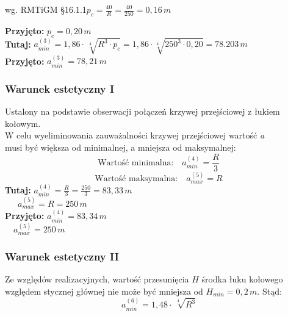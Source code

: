 \documentclass[12pt]{article}
\begin{document}
            \qquad wg. RMTiGM §16.1.1\quad \( p_{c}=\frac{40}{R}=\frac{40}{250}=0,16\,m \)

            \qquad \textbf{Przyjęto:} $p_{c}=0,20\,m$ \\

            \textbf{Tutaj:} \( a_{min}^{(3)} = 1,86 \cdot\, \sqrt[4]{R^{3} \cdot p_{c}} = 1,86 \cdot \sqrt[4]{250^{3} \cdot 0,20} = 78.203\,m \)\\
            
            \textbf{Przyjęto:} \( a_{min}^{(3)}=78,21\,m \)
        
        \subsubsection{Warunek estetyczny I}
            Ustalony na podstawie obserwacji połączeń krzywej przejściowej z łukiem kołowym.\\
            W celu wyeliminowania zauważalności krzywej przejściowej wartość \textit{a} \\
            musi być większa od minimalnej, a mniejsza od maksymalnej:
            \begin{equation}
               \mbox{Wartość minimalna:}\quad a_{min}^{(4)}=\frac{R}{3}
            \end{equation}
            \begin{equation}
                \mbox{Wartość maksymalna:}\quad a_{max}^{(5)}=R
            \end{equation}
            \newline
            \textbf{Tutaj:} \( a_{min}^{(4)}=\frac{R}{3}=\frac{250}{3}=83,33\,m \)\\

            \qquad \,\,\,\,\,\,\, \( a_{max}^{(5)}=R=250\,m \)\\

            \textbf{Przyjęto:} \(a_{min}^{(4)}=83,34\,m \)\\

            \qquad \quad \quad \,\,\,\,  \( a_{max}^{(5)}=250\,m \)

        \subsubsection{Warunek estetyczny II}
            Ze względów realizacyjnych, wartość przesunięcia \(H\) środka łuku kołowego\\
            względem stycznej głównej nie może być mniejsza od \( H_{min}=0,2\,m \). Stąd:
            \begin{equation}
                a_{min}^{(6)}=1,48 \cdot\, \sqrt[4]{R^{3}}
            \end{equation}
\end{document}
